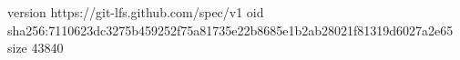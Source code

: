 version https://git-lfs.github.com/spec/v1
oid sha256:7110623dc3275b459252f75a81735e22b8685e1b2ab28021f81319d6027a2e65
size 43840
